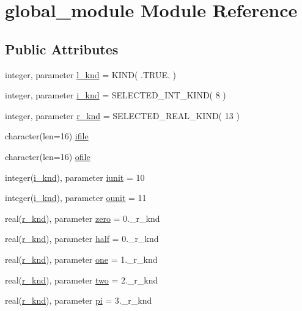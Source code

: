 \hypertarget{classglobal__module}{\section{global\-\_\-module Module Reference}
\label{classglobal__module}
}
\subsection*{Public Attributes}
\begin{DoxyCompactItemize}
\item 
integer, parameter \hyperlink{classglobal__module_a968ba1aa6e3f1767b59bfb8bd310405e}{l\-\_\-knd} = K\-I\-N\-D( .T\-R\-U\-E. )
\item 
integer, parameter \hyperlink{classglobal__module_a01b861666154d8b3e5bd725ae8933438}{i\-\_\-knd} = S\-E\-L\-E\-C\-T\-E\-D\-\_\-\-I\-N\-T\-\_\-\-K\-I\-N\-D( 8 )
\item 
integer, parameter \hyperlink{classglobal__module_ab88bc58495adcaa0c39aac0c541fe8c8}{r\-\_\-knd} = S\-E\-L\-E\-C\-T\-E\-D\-\_\-\-R\-E\-A\-L\-\_\-\-K\-I\-N\-D( 13 )
\item 
character(len=16) \hyperlink{classglobal__module_a94b80c776276c5e9e870df62cdc27b1d}{ifile}
\item 
character(len=16) \hyperlink{classglobal__module_aa25a5f9ded0bd9460cc9a5c842a6812b}{ofile}
\item 
integer(\hyperlink{classglobal__module_a01b861666154d8b3e5bd725ae8933438}{i\-\_\-knd}), parameter \hyperlink{classglobal__module_a734e710669b353233ba6b431d2b10a60}{iunit} = 10
\item 
integer(\hyperlink{classglobal__module_a01b861666154d8b3e5bd725ae8933438}{i\-\_\-knd}), parameter \hyperlink{classglobal__module_a3d8941f8c329162cde48206e253955f5}{ounit} = 11
\item 
real(\hyperlink{classglobal__module_ab88bc58495adcaa0c39aac0c541fe8c8}{r\-\_\-knd}), parameter \hyperlink{classglobal__module_aee835b3a70993d265b7592f2485da98a}{zero} = 0.\-\_\-r\-\_\-knd
\item 
real(\hyperlink{classglobal__module_ab88bc58495adcaa0c39aac0c541fe8c8}{r\-\_\-knd}), parameter \hyperlink{classglobal__module_aca3045154e42c1413c7e40cff43d609b}{half} = 0.\-\_\-r\-\_\-knd
\item 
real(\hyperlink{classglobal__module_ab88bc58495adcaa0c39aac0c541fe8c8}{r\-\_\-knd}), parameter \hyperlink{classglobal__module_ad2273c99f1e5fd95558f9217ed48f65f}{one} = 1.\-\_\-r\-\_\-knd
\item 
real(\hyperlink{classglobal__module_ab88bc58495adcaa0c39aac0c541fe8c8}{r\-\_\-knd}), parameter \hyperlink{classglobal__module_ae882a53fa5147b5a17b1de231a9edc1e}{two} = 2.\-\_\-r\-\_\-knd
\item 
real(\hyperlink{classglobal__module_ab88bc58495adcaa0c39aac0c541fe8c8}{r\-\_\-knd}), parameter \hyperlink{classglobal__module_ac248f55c9fa522378b386ab9456aec4e}{pi} = 3.\-\_\-r\-\_\-knd
\end{DoxyCompactItemize}


